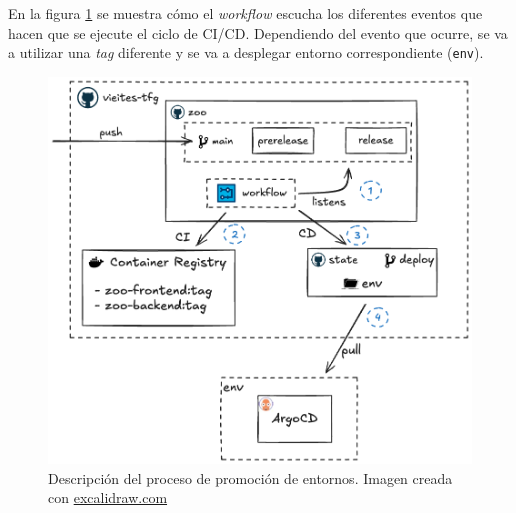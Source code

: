 En la figura \ref{fig:promotion} se muestra cómo el \textit{workflow} escucha los diferentes eventos que hacen que se ejecute el ciclo de CI/CD. Dependiendo del evento que ocurre, se va a utilizar una \textit{tag} diferente y se va a desplegar entorno correspondiente (\texttt{env}).

\begin{figure}[h]
  \centerline{\includegraphics[width=13cm]{figuras/promotion}}
  \caption{Descripción del proceso de promoción de entornos. Imagen creada con \href{https://excalidraw.com}{excalidraw.com}}
  \label{fig:promotion}
\end{figure}



